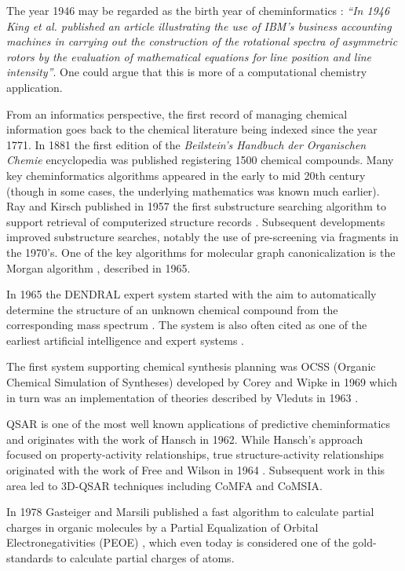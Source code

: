 \documentclass{sig-alternate}
\begin{document}
The year 1946 may be regarded as the birth year of cheminformatics
\cite{Chen2006}: \textit{``In 1946 King et al.\cite{kct1946} published
  an article illustrating the use of IBM's business accounting
  machines in carrying out the construction of the rotational spectra
  of asymmetric rotors by the evaluation of mathematical equations for
  line position and line intensity''}. One could argue that this is
more of a computational chemistry application.

From an informatics perspective, the first record of managing chemical
information goes back to the chemical literature being indexed since
the year 1771.  In 1881 the first edition of the \textit{Beilstein's
  Handbuch der Organischen Chemie} encyclopedia was published
\cite{polanski2009} registering 1500 chemical compounds.  Many key
cheminformatics algorithms appeared in the early to mid 20th century
(though in some cases, the underlying mathematics was known much
earlier). Ray and Kirsch published in 1957 the first substructure
searching algorithm to support retrieval of computerized structure
records \cite{RayKirsch1957}. Subsequent developments improved
substructure searches, notably the use of pre-screening via fragments
\cite{Adamson:1973fk,Feldman:1975uq} in the 1970's. One of the key
algorithms for molecular graph canonicalization is the Morgan
algorithm \cite{Morgan1965}, described in 1965.

In 1965 the DENDRAL expert system started with the aim to
automatically determine the structure of an unknown chemical compound
from the corresponding mass spectrum \cite{Gray1986}. The system is
also often cited as one of the earliest artificial intelligence
and expert systems \cite{Chen2006}.

The first system supporting chemical synthesis planning was OCSS
(Organic Chemical Simulation of Syntheses) developed by Corey and
Wipke in 1969 \cite{CoreyWipke1969} which in turn was an
implementation of theories described by Vleduts in 1963
\cite{Vleduts:1963kx}.

QSAR is one of the most well known applications of predictive
cheminformatics and originates with the work of Hansch
\cite{Hansch:1962vn} in 1962. While Hansch's approach focused on
property-activity relationships, true structure-activity relationships
originated with the work of Free and Wilson in 1964
\cite{Free:1964ys}. Subsequent work in this area led to 3D-QSAR
techniques including CoMFA \cite{Cramer:1988zr} and
CoMSIA\cite{Klebe:1994ly}.

In 1978 Gasteiger and Marsili published a fast algorithm to calculate
partial charges in organic molecules by a Partial Equalization of
Orbital Electronegativities (PEOE) \cite{gm78}, which even today
is considered one of the gold-standards to calculate partial charges of atoms.
\end{document}

